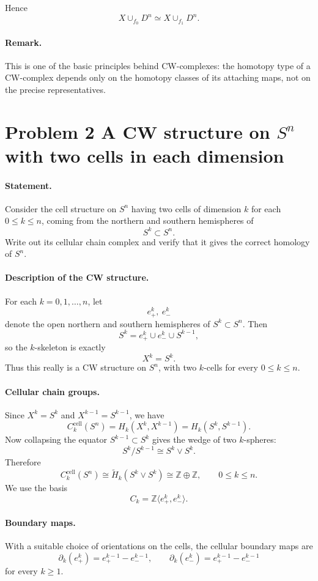 \documentclass[12pt,a4paper]{article}
\theoremstyle{notespace}
\begin{document}
Hence
\[
X\cup_{f_0}D^n \simeq X\cup_{f_1}D^n.
\]

\paragraph{Remark.}
This is one of the basic principles behind CW-complexes: the homotopy type of a CW-complex depends only on the homotopy classes of its attaching maps, not on the precise representatives.

\bigskip

\section{Problem 2 A CW structure on \(S^n\) with two cells in each dimension}

\paragraph{Statement.}
Consider the cell structure on \(S^n\) having two cells of dimension \(k\) for each \(0\le k\le n\), coming from the northern and southern hemispheres of
\[
S^k\subset S^n .
\]
Write out its cellular chain complex and verify that it gives the correct homology of \(S^n\).

\paragraph{Description of the CW structure.}
For each \(k=0,1,\dots,n\), let
\[
e^k_+,\ e^k_-
\]
denote the open northern and southern hemispheres of \(S^k\subset S^n\). Then
\[
S^k = e^k_+ \cup e^k_- \cup S^{k-1},
\]
so the \(k\)-skeleton is exactly
\[
X^k=S^k.
\]
Thus this really is a CW structure on \(S^n\), with two \(k\)-cells for every \(0\le k\le n\).

\paragraph{Cellular chain groups.}
Since \(X^k=S^k\) and \(X^{k-1}=S^{k-1}\), we have
\[
C_k^{\mathrm{cell}}(S^n)=H_k(X^k,X^{k-1})=H_k(S^k,S^{k-1}).
\]
Now collapsing the equator \(S^{k-1}\subset S^k\) gives the wedge of two \(k\)-spheres:
\[
S^k/S^{k-1}\cong S^k\vee S^k.
\]
Therefore
\[
C_k^{\mathrm{cell}}(S^n)\cong \widetilde H_k(S^k\vee S^k)\cong \mathbb Z\oplus \mathbb Z,
\qquad 0\le k\le n.
\]
We use the basis
\[
C_k=\mathbb Z\langle e^k_+,e^k_-\rangle .
\]

\paragraph{Boundary maps.}
With a suitable choice of orientations on the cells, the cellular boundary maps are
\[
\partial_k(e^k_+) = e^{k-1}_+ - e^{k-1}_-,\qquad
\partial_k(e^k_-) = e^{k-1}_+ - e^{k-1}_-
\]
for every \(k\ge 1\).
\end{document}
